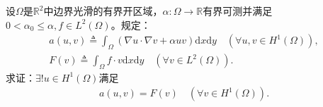 \documentclass[../../main.tex]{subfiles}%
\begin{document}
\begin{example}
设$\Omega$是$\mathbb{R}^2$中边界光滑的有界开区域，$\alpha:\Omega\to\mathbb{R}$有界可测并满足$0<\alpha_0\leqslant\alpha,f\in L^2(\Omega)$。规定：
\begin{align*}
a(u,v)\triangleq\int_{\Omega}(\nabla u\cdot\nabla v+\alpha uv)\mathrm{d}x\mathrm{d}y\quad (\forall u,v\in H^1(\Omega)),\\
F(v)\triangleq\int_{\Omega}f\cdot v\mathrm{d}x\mathrm{d}y\quad (\forall v\in L^2(\Omega)).
\end{align*}
求证：$\exists!u\in H^1(\Omega)$满足
\begin{align*}
a(u,v)=F(v)\quad (\forall v\in H^1(\Omega)).
\end{align*}
\end{example}
\end{document}
